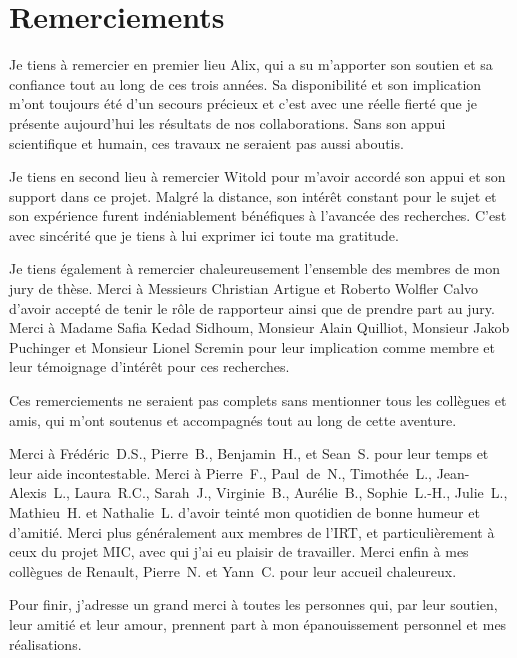 \chapter*{Remerciements}

Je tiens à remercier en premier lieu Alix, qui a su m'apporter son soutien et sa confiance tout au long de ces trois années.
Sa disponibilité et son implication m'ont toujours été d'un secours précieux et c'est avec une réelle fierté que je présente aujourd'hui les résultats de nos collaborations.
Sans son appui scientifique et humain, ces travaux ne seraient pas aussi aboutis.

\medskip
Je tiens en second lieu à remercier Witold pour m'avoir accordé son appui et son support dans ce projet.
Malgré la distance, son intérêt constant pour le sujet et son expérience furent indéniablement bénéfiques à l'avancée des recherches.
C'est avec sincérité que je tiens à lui exprimer ici toute ma gratitude.

\medskip
Je tiens également à remercier chaleureusement l'ensemble des membres de mon jury de thèse.
Merci à Messieurs Christian Artigue et Roberto Wolfler Calvo d'avoir accepté de tenir le rôle de rapporteur ainsi que de prendre part au jury.
Merci à Madame Safia Kedad Sidhoum, Monsieur Alain Quilliot, Monsieur Jakob Puchinger et Monsieur Lionel Scremin pour leur implication comme membre et leur témoignage d'intérêt pour ces recherches.

\medskip
Ces remerciements ne seraient pas complets sans mentionner tous les collègues et amis, qui m'ont soutenus et accompagnés tout au long de cette aventure.

Merci à \mbox{Frédéric D.S.}, \mbox{Pierre B.}, \mbox{Benjamin H.}, et \mbox{Sean S.} pour leur temps et leur aide incontestable.
Merci à \mbox{Pierre F.}, \mbox{Paul de N.}, \mbox{Timothée L.}, \mbox{Jean-Alexis L.}, \mbox{Laura R.C.}, \mbox{Sarah J.}, \mbox{Virginie B.}, \mbox{Aurélie B.}, \mbox{Sophie L.-H.}, \mbox{Julie L.}, \mbox{Mathieu H.} et \mbox{Nathalie L.} d'avoir teinté mon quotidien de bonne humeur et d'amitié.
Merci plus généralement aux membres de l'IRT, et particulièrement à ceux du projet MIC, avec qui j'ai eu plaisir de travailler.
Merci enfin à mes collègues de Renault, \mbox{Pierre N.} et \mbox{Yann C.} pour leur accueil chaleureux.

\medskip
Pour finir, j'adresse un grand merci à toutes les personnes qui, par leur soutien, leur amitié et leur amour, prennent part à mon épanouissement personnel et mes réalisations.
